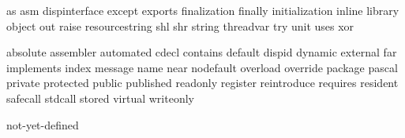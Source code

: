 \useprettyidentifiers \PASidentifiers \PASsetspecials
  as asm dispinterface except exports finalization finally
  initialization inline library object out raise resourcestring
  shl shr string threadvar try unit uses xor


\useprettyidentifiers \PASidentifiers \PASsetspecials
  absolute assembler automated cdecl contains default dispid
  dynamic external far implements index message name near
  nodefault overload override package pascal private protected
  public published readonly register reintroduce requires
  resident safecall stdcall stored virtual writeonly

\useprettyidentifiers \PASvariables \PASsetspecials
  not-yet-defined

\protect \endinput
